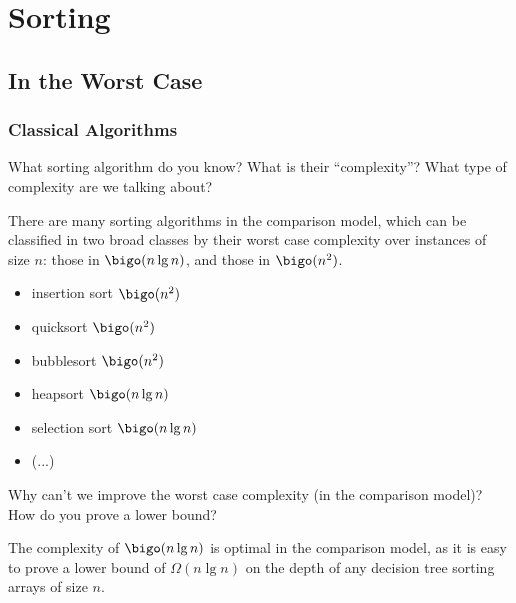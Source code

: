 
\chapter{Sorting}
\label{cha:adapt-analys-sort}



\section{In the Worst Case}
\label{sec:worst-case}

\subsection{Classical Algorithms}
\label{sec:classical-algorithms}


\begin{interaction}
  What sorting algorithm do you know? What is their ``complexity''?
  What type of complexity are we talking about?
\end{interaction}

There are many sorting algorithms in the comparison model, which can
be classified in two broad classes by their worst case complexity over
instances of size $n$: those in $\bigo(n\lg n)$, and those in
$\bigo(n^2)$.

\begin{itemize}
\item insertion sort $\bigo(n^2)$
\item quicksort $\bigo(n^2)$
\item bubblesort $\bigo(n^2)$
\item heapsort $\bigo(n\lg n)$
\item selection sort $\bigo(n\lg n)$
\item (...)
\end{itemize}

\begin{interaction} 
  Why can't we improve the worst case complexity (in the
  comparison model)? How do you prove a lower bound?
\end{interaction}


The complexity of $\bigo(n\lg n)$ is optimal in the comparison model,
as it is easy to prove a lower bound of $\Omega(n\lg n)$ on the depth
of any decision tree sorting arrays of size $n$.


